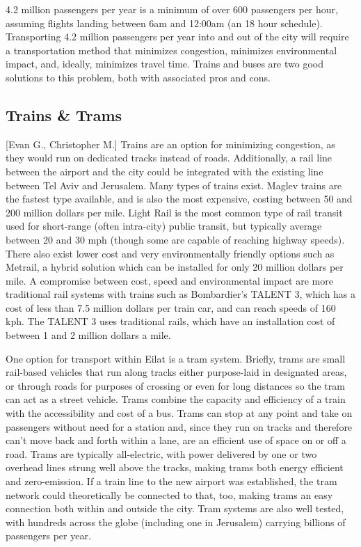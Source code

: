 \documentclass[12pt]{article}                         %
\begin{document}
4.2 million passengers per year is a minimum of over 600 passengers per hour, assuming flights landing between 6am and 12:00am (an 18 hour schedule). Transporting 4.2 million passengers per year into and out of the city will require a transportation method that minimizes congestion, minimizes environmental impact, and, ideally, minimizes travel time. Trains and buses are two good solutions to this problem, both with associated pros and cons.

\subsection{Trains \& Trams}[Evan G., Christopher M.]
Trains are an option for minimizing congestion, as they would run on dedicated tracks instead of roads. Additionally, a rail line between the airport and the city could be integrated with the existing line between Tel Aviv and Jerusalem. Many types of trains exist. Maglev trains are the fastest type available, and is also the most expensive, costing between 50 and 200 million dollars per mile. Light Rail is the most common type of rail transit used for short-range (often intra-city) public transit, but typically average between 20 and 30 mph (though some are capable of reaching highway speeds). There also exist lower cost and very environmentally friendly options such as Metrail, a hybrid solution which can be installed for only 20 million dollars per mile. A compromise between cost, speed and environmental impact are more traditional rail systems with trains such as Bombardier's TALENT 3, which has a cost of less than 7.5 million dollars per train car, and can reach speeds of 160 kph. The TALENT 3 uses traditional rails, which have an installation cost of between 1 and 2 million dollars a mile.

One option for transport within Eilat is a tram system. Briefly, trams are small rail-based vehicles that run along tracks either purpose-laid in designated areas, or through roads for purposes of crossing or even for long distances so the tram can act as a street vehicle. Trams combine the capacity and efficiency of a train with the accessibility and cost of a bus. Trams can stop at any point and take on passengers without need for a station and, since they run on tracks and therefore can't move back and forth within a lane, are an efficient use of space on or off a road. Trams are typically all-electric, with power delivered by one or two overhead lines strung well above the tracks, making trams both energy efficient and zero-emission. If a train line to the new airport was established, the tram network could theoretically be connected to that, too, making trams an easy connection both within and outside the city. Tram systems are also well tested, with hundreds across the globe (including one in Jerusalem) carrying billions of passengers per year.
\end{document}
